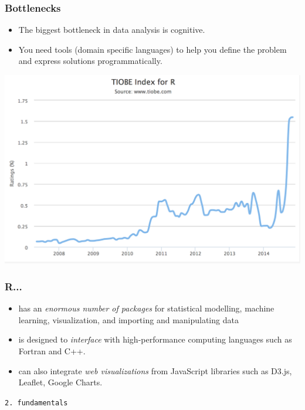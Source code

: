 \documentclass[10pt,c]{beamer}
\begin{document}
\endgroup
\begin{frame}
\frametitle{Bottlenecks}
\begin{itemize}[<+->]
\item The biggest bottleneck in data analysis is cognitive.
\item You need tools (domain specific languages) to help you define the problem and express solutions programmatically.
\end{itemize}
\end{frame}
\begingroup
{}
\begin{frame}[plain]
\begin{center}
\includegraphics[width=\textwidth]{img/tiobe_r.png}
\end{center}
\end{frame}
\endgroup
\begin{frame}
\frametitle{R...}
\begin{itemize}[<+->]
\item has an \emph{enormous number of packages} for statistical modelling, machine learning, visualization, and importing and manipulating data
\item is designed to \emph{interface} with high-performance computing
languages such as Fortran and C++.
\item can also integrate \emph{web visualizations} from JavaScript libraries such as D3.js,
Leaflet, Google Charts.
\end{itemize}
\end{frame}
\begingroup
\begin{frame}[plain]
\vspace{1.5cm}
\begin{center}
\Large\texttt{2. fundamentals}
\end{center}
\end{frame}
\end{document}
